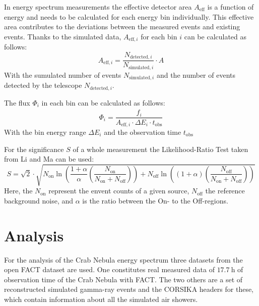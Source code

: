     In energy spectrum measurements the effective detector area $A_\text{eff}$ is a function of energy and needs to be calculated for each energy bin individually.
    This effective area contributes to the deviations between the measured events and existing events.
    Thanks to the simulated data, $A_{\text{eff},i}$ for each bin $i$ can be calculated as follows:
    \begin{equation}
        A_{\text{eff},i} = \frac{N_{\text{detected},i}}{N_{\text{simulated},i}} \cdot A
        \label{eq:acceptance}
    \end{equation}
    With the sumulated number of events $N_{\text{simulated},i}$ and the number of events detected by the telescope $N_{\text{detected},i}$.

    The flux $\Phi_i$ in each bin can be calculated as follows:
    \begin{equation}
        \Phi_i = \frac{\hat{f}_i}{A_{\text{eff},i} \cdot \Delta E_i \cdot t_\text{obs}}
        \label{eq:flux}
    \end{equation}
    With the bin energy range $\Delta E_i$ and the observation time $t_\text{obs}$
    
    For the significance $S$ of a whole measurement the Likelihood-Ratio Test taken from Li and Ma \cite{significance} can be used:
    \begin{equation}
        S = \sqrt{2} \cdot \sqrt{N_\text{on} \ln\left( \frac{1 + \alpha}{\alpha} \left( \frac{N_\text{on}}{N_\text{on} + N_\text{off}} \right) \right) + N_\text{off} \ln\left( (1 + \alpha) \left( \frac{N_\text{off}}{N_\text{on} + N_\text{off}} \right) \right) }
        \label{eq:significance}
    \end{equation}
    Here, the $N_\text{on}$ represent the envent counts of a given source, $N_\text{off}$ the reference background noise, and $\alpha$ is the ratio between the On- to the Off-regions.
%
%
    \section{Analysis}
        For the analysis of the Crab Nebula energy spectrum three datasets from the open FACT dataset are used.\cite{FACTData}
        \newline
        One constitutes real measured data of $\SI{17.7}{\hour}$ of observation time of the Crab Nebula with FACT.
        The two others are a set of reconstructed simulated gamma-ray events and the CORSIKA headers for these, which contain information about all the simulated air showers.

